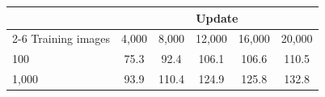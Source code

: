 \centering
\begin{tabular}{lccccc}
    \toprule
                    & \multicolumn{5}{c}{Update}                   \\
    \cmidrule(lr){2-6}
    Training images & 4,000 & 8,000 & 12,000 & 16,000 & 20,000     \\
    \midrule
    100             & 75.3  & 92.4  & 106.1  & 106.6  & 110.5      \\
    1,000           & 93.9  & 110.4 & 124.9  & 125.8  & 132.8      \\
    \bottomrule
\end{tabular}
